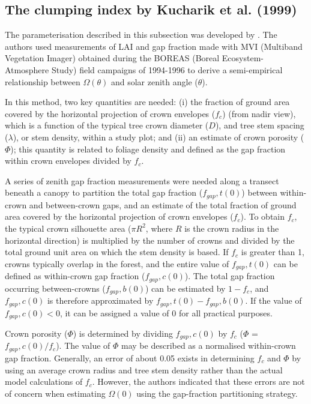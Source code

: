\documentclass[a4paper,11pt]{report}
\begin{document}
\subsection{The clumping index by Kucharik et al. (1999)}
The parameterisation described in this subsection was developed by \citet{Kucharik1999}. The authors used measurements of LAI and gap fraction made with MVI (Multiband Vegetation Imager) \citep{Kucharik1997} obtained during the BOREAS (Boreal Ecosystem-Atmosphere Study) \citep{Sellers1997} field campaigns of 1994-1996 to derive a semi-empirical relationship between $\Omega(\theta)$ and solar zenith angle ($\theta$). 

In this method, two key quantities are needed: (i) the fraction of ground area covered by the horizontal projection of crown envelopes ($f_c$) (from nadir view), which is a function of the typical tree crown diameter ($D$), and tree stem spacing ($\lambda$), or stem density, within a study plot; and (ii) an estimate of crown porosity ($\Phi$); this quantity is related to foliage density and defined as the gap fraction within crown envelopes divided by $f_c$.
 
A series of zenith gap fraction measurements were needed along a transect beneath a canopy to partition the total gap fraction ($f_{gap},t(0)$) between within-crown and between-crown gaps, and  an estimate of the total fraction of ground area covered by the horizontal projection of crown envelopes ($f_c$). To obtain $f_c$, the typical crown silhouette area ($\pi R^2$, where $R$ is the crown radius in the horizontal direction) is multiplied by the number of crowns and divided by the total ground unit area on which the stem density is based. If $f_c$ is greater than 1, crowns typically overlap in the forest, and the entire value of $f_{gap},t(0)$ can be defined as within-crown gap fraction ($f_{gap},c(0)$). The total gap fraction occurring between-crowns ($f_{gap},b(0)$) can be estimated by $1 - f_c$, and $f_{gap},c(0)$ is therefore approximated by $f_{gap},t(0) - f_{gap},b(0)$. If the value of $f_{gap},c(0) < 0$, it can be assigned a value of 0 for all practical purposes. 

Crown porosity ($\Phi$) is determined by dividing $f_{gap},c(0)$ by $f_c$ ($\Phi$ = $f_{gap},c(0)/f_c$). The value of $\Phi$ may be described as a normalised within-crown gap fraction. Generally, an error of about 0.05 exists in determining $f_c$ and $\Phi$ by using an average crown radius and tree stem density rather than the actual model calculations of $f_c$. However, the authors indicated that these errors are not of concern when estimating $\Omega(0)$ using the gap-fraction partitioning strategy.
\end{document}

